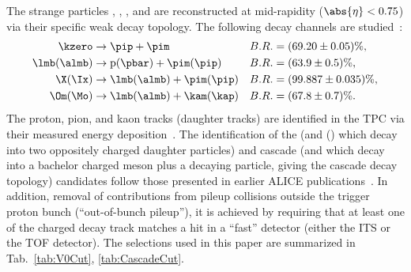 \documentclass[ALICE,manyauthors]{cernphprep}
\begin{document}
The strange particles \kzero, \lmb, \almb, \Xis and \Oms are reconstructed at mid-rapidity ($\abs{\eta} < 0.75$) via their specific weak decay topology.
The following decay channels are studied~\cite{PhysRevD.98.030001}:
$$
\begin{aligned}
\kzero      & \to \pip + \pim               & B.R. & = (69.20 \pm 0.05) \%, \\
\lmb (\almb) & \to \mathrm{p}(\pbar) + \pim (\pip)    & B.R. & = (63.9  \pm 0.5)  \%, \\
\X (\Ix)    & \to \lmb (\almb) + \pim (\pip) & B.R. & = (99.887 \pm 0.035) \%, \\
\Om (\Mo)   & \to \lmb (\almb) + \kam (\kap) & B.R. & = (67.8  \pm 0.7)  \%. \\
\end{aligned}
$$
The proton, pion, and kaon tracks (daughter tracks) are identified in the TPC via their measured energy deposition~\cite{Abelev:2014ffa}.
The identification of the \Vzero (\kzero and \lmb (\almb) which decay into two oppositely charged daughter particles) and cascade (\Xis and \Oms which decay into a bachelor charged meson plus a \Vzero decaying particle, giving the cascade decay topology) candidates follow those presented in earlier ALICE publications~\cite{Aamodt:2011zza, Abelev:2012jp, Acharya:2018orn, Abelev:2013haa, Acharya:2020uxl, Acharya:2019kyh}.
In addition, removal of contributions from pileup collisions outside the trigger proton bunch (``out-of-bunch pileup''), it is achieved by requiring  that at least one of the charged decay track matches a hit in a ``fast'' detector (either the ITS or the TOF detector).
The selections used in this paper are summarized in Tab.~\ref{tab:V0Cut}, \ref{tab:CascadeCut}.
\end{document}
